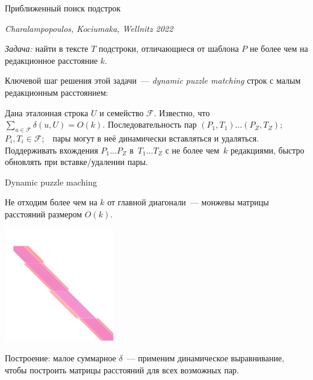 \documentclass[svgnames]{beamer}
\newcommand{\flink}[1]{{\footnotesize\it\color{SkyBlue!40!White} #1}}
\begin{document}
\begin{frame}{Приближенный поиск подстрок}

\flink{Charalampopoulos, Kociumaka, Wellnitz 2022} \vspace{-1mm}

\begin{block}{\vspace*{-3ex}}
  {\it Задача:} найти в тексте \(T\) подстроки, отличающиеся от шаблона \(P\) не более чем на редакционное расстояние \(k\).
\end{block} \vspace{4mm}

Ключевой шаг решения этой задачи~— {\it dynamic puzzle matching} строк с малым редакционным расстоянием:

\begin{block}{\vspace*{-3ex}}
  Дана эталонная строка \(U\) и семейство \(\mathcal F\).
  Известно, что \(\sum_{u \in \mathcal F} \delta (u, U) = O(k)\).
  Последовательность пар \((P_1, T_1) \ldots (P_Z, T_Z)\);\ \ 
  \(P_i, T_i \in \mathcal F\);\ \ пары могут в неё динамически
  вставляться и удаляться. Поддерживать вхождения
  \(P_1 \ldots P_Z\) в~\(T_1 \ldots T_Z\) с не более
  чем~\(k\) редакциями, быстро обновлять при вставке/удалении пары.
\end{block} \vspace{8mm}

\end{frame}


\begin{frame}{Dynamic puzzle maching}
\vspace{-3.5mm}

Не отходим более чем на \(k\) от главной диагонали~— монжевы матрицы расстояний размером \(O(k)\).

\begin{center}
  \includegraphics[width=4.8cm]{svg/wellnitz}
\end{center}

Построение: малое суммарное \(\delta\)~— применим динамическое выравнивание, чтобы построить матрицы расстояний для всех возможных пар.

\end{frame}
\end{document}
